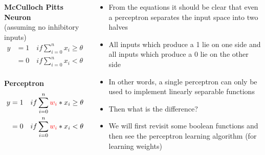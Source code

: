 \documentclass[serif, aspectratio=169]{beamer}
\begin{document}
\begin{frame}
\begin{columns}

\begin{overlayarea}{\textwidth}{\textheight}

\textbf{McCulloch Pitts Neuron}\\
(assuming no inhibitory inputs)
\begin{align*}
y &=1 \quad if \sum^{n}_{i=0} x_i \geq \theta \\
&=0  \quad if \sum^{n}_{i=0} x_i < \theta \\
\end{align*}

\textbf{Perceptron}
\begin{align*}
y &=1 \quad if \sum^{n}_{i=0} \color{red}{w_i} \color{black}{} * x_i \geq \theta \\
&=0  \quad if \sum^{n}_{i=0} \color{red}{w_i} \color{black}{} * x_i < \theta\\
\end{align*}


\end{overlayarea}

\begin{overlayarea}{\textwidth}{\textheight}
\begin{itemize}\justifying
\item<2-> From the equations it should be clear that even a perceptron separates the input space into two halves
\item<3-> All inputs which produce a 1 lie on one side and all inputs which produce a 0 lie on the other side
\item<4-> In other words, a single perceptron can only be used to implement linearly separable functions
\item<5-> Then what is the difference? 
\item<7-> We will first revisit some boolean functions and then see the perceptron learning algorithm (for learning weights) 
\end{itemize}
\end{overlayarea}
\end{columns}
\end{frame}
\end{document}
